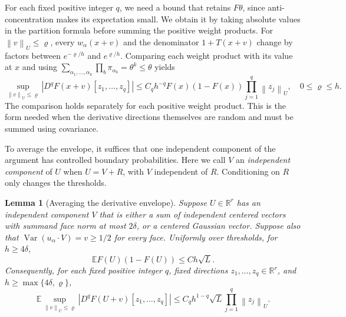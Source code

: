 \documentclass[11pt,letterpaper]{article}
\newtheorem{lemma}{Lemma}
\theoremstyle{remark}
\newcommand{\E}{\mathbb E}
\newcommand{\R}{\mathbb R}
\newcommand{\Var}{\operatorname{Var}}
\newcommand{\norm}[1]{\left\lVert#1\right\rVert}
\begin{document}
For each fixed {positive integer \(q\)}, we need a bound that retains
\(F\theta\), since anti-concentration makes its expectation small.
We obtain it by taking absolute values in the partition formula
before summing the positive weight products.
For \(\norm v_U\le\varrho\), every \(w_\alpha(x+v)\) and the
denominator \(1+T(x+v)\) change by factors between
\(e^{-\varrho/h}\) and \(e^{\varrho/h}\). Comparing each weight
product with its value at \(x\) and using
\(\sum_{\alpha_1,\ldots,\alpha_k}\prod_b\pi_{\alpha_b}
=\theta^k\le\theta\) yields
\begin{equation}
 \sup_{\norm v_U\le\varrho}|D^qF(x+v)[z_1,\ldots,z_q]|
 \le C_qh^{-q}F(x)(1-F(x))\prod_{j=1}^q\norm{z_j}_U,
 \quad 0\le\varrho\le h.
 \label{appx-eq:local-envelope}
\end{equation}
The comparison holds separately for each positive weight product.
This is the form needed when the derivative directions themselves
are random and must be summed using covariance.

To average the envelope, it suffices that one independent component
of the argument has controlled boundary probabilities. Here we call
\(V\) an \emph{independent component} of \(U\) when \(U=V+R\), with
\(V\) independent of \(R\). Conditioning on \(R\) only changes the thresholds.
\begin{lemma}[Averaging the derivative envelope]\label{appx-lem:envelope}
Suppose \(U\in\R^r\) has an independent component \(V\) that is
either a sum of independent centered vectors with summand face norm
at most \(2\delta\), or a centered Gaussian vector. Suppose also
that \(\Var(u_\alpha\cdot V)=v\ge1/2\) for every face.
Uniformly over thresholds, for \(h\ge4\delta\),
\begin{equation}
 \E F(U)(1-F(U))\le Ch\sqrt L.
 \label{appx-eq:small-envelope}
\end{equation}
Consequently, for {each fixed positive integer \(q\)}, fixed directions
\(z_1,\ldots,z_q\in\R^r\), and \(h\ge\max\{4\delta,\varrho\}\),
\begin{equation}
 \E\sup_{\norm v_U\le\varrho}|D^qF(U+v)[z_1,\ldots,z_q]|
 \le C_qh^{1-q}\sqrt L\prod_{j=1}^q\norm{z_j}_U.
 \label{appx-eq:averaged-derivatives}
\end{equation}
\end{lemma}
\end{document}
